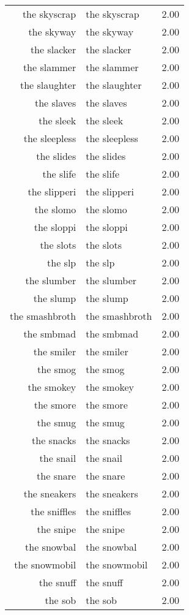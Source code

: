 \begin{table}[ht]
\begin{tabular}{rlr}
  the skyscrap & the skyscrap & 2.00 \\ 
  the skyway & the skyway & 2.00 \\ 
  the slacker & the slacker & 2.00 \\ 
  the slammer & the slammer & 2.00 \\ 
  the slaughter & the slaughter & 2.00 \\ 
  the slaves & the slaves & 2.00 \\ 
  the sleek & the sleek & 2.00 \\ 
  the sleepless & the sleepless & 2.00 \\ 
  the slides & the slides & 2.00 \\ 
  the slife & the slife & 2.00 \\ 
  the slipperi & the slipperi & 2.00 \\ 
  the slomo & the slomo & 2.00 \\ 
  the sloppi & the sloppi & 2.00 \\ 
  the slots & the slots & 2.00 \\ 
  the slp & the slp & 2.00 \\ 
  the slumber & the slumber & 2.00 \\ 
  the slump & the slump & 2.00 \\ 
  the smashbroth & the smashbroth & 2.00 \\ 
  the smbmad & the smbmad & 2.00 \\ 
  the smiler & the smiler & 2.00 \\ 
  the smog & the smog & 2.00 \\ 
  the smokey & the smokey & 2.00 \\ 
  the smore & the smore & 2.00 \\ 
  the smug & the smug & 2.00 \\ 
  the snacks & the snacks & 2.00 \\ 
  the snail & the snail & 2.00 \\ 
  the snare & the snare & 2.00 \\ 
  the sneakers & the sneakers & 2.00 \\ 
  the sniffles & the sniffles & 2.00 \\ 
  the snipe & the snipe & 2.00 \\ 
  the snowbal & the snowbal & 2.00 \\ 
  the snowmobil & the snowmobil & 2.00 \\ 
  the snuff & the snuff & 2.00 \\ 
  the sob & the sob & 2.00 \\ 

\end{tabular}
\end{table}
